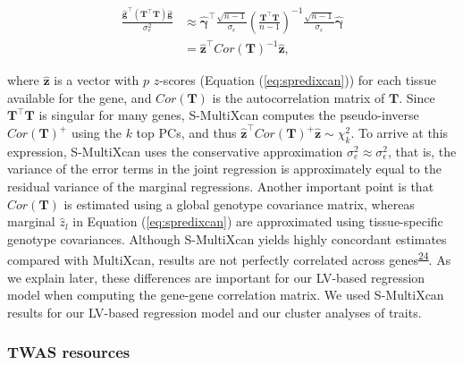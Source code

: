 \documentclass[
  a4paper,
]{article}
\newcommand{\bm}[1]{\boldsymbol{#1}}
\begin{document}
\begin{equation}
\begin{split}
\frac{\hat{\mathbf{g}}^{\top} (\mathbf{T}^{\top}\mathbf{T}) \hat{\mathbf{g}}}{\sigma_{e}^{2}} & \approx \bm{\hat{\gamma}}^{\top} \frac{\sqrt{n-1}}{\sigma_{\epsilon}} \left(\frac{\mathbf{T}^{\top} \mathbf{T}}{n-1}\right)^{-1} \frac{\sqrt{n-1}}{\sigma_{\epsilon}} \bm{\hat{\gamma}} \\
 & = \hat{\mathbf{z}}^{\top} Cor(\mathbf{T})^{-1} \hat{\mathbf{z}},
\end{split}
\label{eq:smultixcan}\end{equation}

where \(\hat{\mathbf{z}}\) is a vector with \(p\) \(z\)-scores (Equation (\ref{eq:spredixcan})) for each tissue available for the gene,
and \(Cor(\mathbf{T})\) is the autocorrelation matrix of \(\mathbf{T}\).
Since \(\mathbf{T}^{\top}\mathbf{T}\) is singular for many genes, S-MultiXcan computes the pseudo-inverse \(Cor(\mathbf{T})^{+}\) using the \(k\) top PCs, and thus \(\hat{\mathbf{z}}^{\top} Cor(\mathbf{T})^{+} \hat{\mathbf{z}} \sim \chi_k^2\).
To arrive at this expression, S-MultiXcan uses the conservative approximation \(\sigma_{e}^{2} \approx \sigma_{\epsilon}^{2}\), that is, the variance of the error terms in the joint regression is approximately equal to the residual variance of the marginal regressions.
Another important point is that \(Cor(\mathbf{T})\) is estimated using a global genotype covariance matrix, whereas marginal \(\hat{z}_l\) in Equation (\ref{eq:spredixcan}) are approximated using tissue-specific genotype covariances.
Although S-MultiXcan yields highly concordant estimates compared with MultiXcan, results are not perfectly correlated across genes\textsuperscript{\protect\hyperlink{ref-1FFzCXo1s}{24}}.
As we explain later, these differences are important for our LV-based regression model when computing the gene-gene correlation matrix.
We used S-MultiXcan results for our LV-based regression model and our cluster analyses of traits.

\hypertarget{sec:methods:twas}{%
\subsubsection{TWAS resources}\label{sec:methods:twas}}
\end{document}
